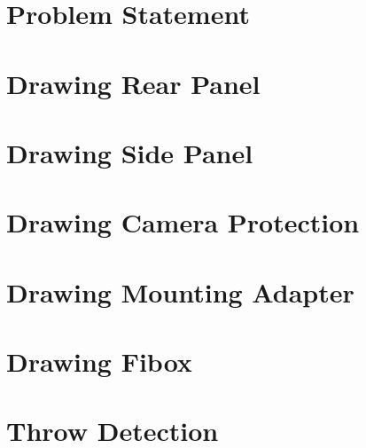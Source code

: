 \begin{appendix}
  \section{Problem Statement}
  \label{app:problem_statement}
  

  \section{Drawing Rear Panel}
  \label{app:drawings_rear_panel}
  

  \section{Drawing Side Panel}
  \label{app:drawings_side_panel}
  

  \section{Drawing Camera Protection}
  \label{app:drawings_camera_protection}
  

  \section{Drawing Mounting Adapter}
  \label{app:drawings_mounting_adapter}
  

  \section{Drawing Fibox}
  \label{app:drawings_fibox_bottom}
  

  \section{Throw Detection}
  \label{app:throw_detection}
  
\end{appendix}
